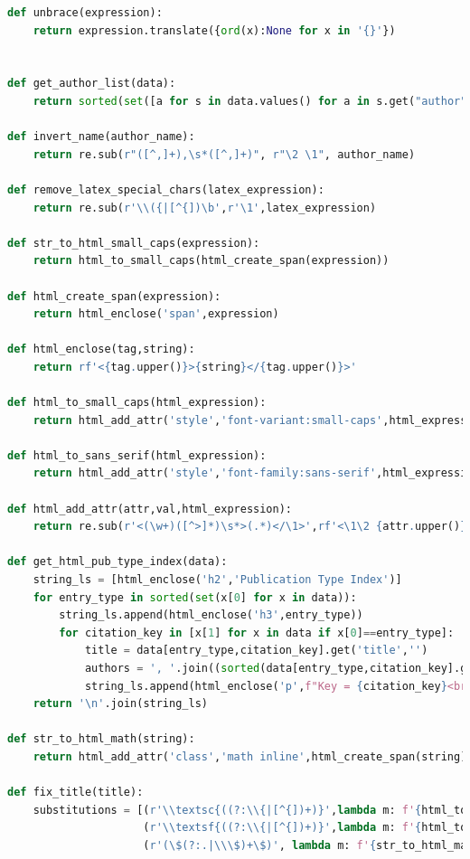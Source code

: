 \documentclass[11pt,a4paper]{report}
\begin{document}
\begin{appendices}
\begin{lstlisting}[language=python]
def unbrace(expression):
    return expression.translate({ord(x):None for x in '{}'})


def get_author_list(data):
    return sorted(set([a for s in data.values() for a in s.get("author", [])]))

def invert_name(author_name):
    return re.sub(r"([^,]+),\s*([^,]+)", r"\2 \1", author_name)

def remove_latex_special_chars(latex_expression):
    return re.sub(r'\\({|[^{])\b',r'\1',latex_expression)

def str_to_html_small_caps(expression):
    return html_to_small_caps(html_create_span(expression))

def html_create_span(expression):
    return html_enclose('span',expression)

def html_enclose(tag,string):
    return rf'<{tag.upper()}>{string}</{tag.upper()}>'

def html_to_small_caps(html_expression):
    return html_add_attr('style','font-variant:small-caps',html_expression)

def html_to_sans_serif(html_expression):
    return html_add_attr('style','font-family:sans-serif',html_expression)

def html_add_attr(attr,val,html_expression):
    return re.sub(r'<(\w+)([^>]*)\s*>(.*)</\1>',rf'<\1\2 {attr.upper()}="{val}">\3</\1>',html_expression)

def get_html_pub_type_index(data):
    string_ls = [html_enclose('h2','Publication Type Index')]
    for entry_type in sorted(set(x[0] for x in data)):
        string_ls.append(html_enclose('h3',entry_type))
        for citation_key in [x[1] for x in data if x[0]==entry_type]:
            title = data[entry_type,citation_key].get('title','')
            authors = ', '.join((sorted(data[entry_type,citation_key].get('author',''))))
            string_ls.append(html_enclose('p',f"Key = {citation_key}<br>Title = {fix_title(title)}<br>Autores = {authors}"))
    return '\n'.join(string_ls)

def str_to_html_math(string):
    return html_add_attr('class','math inline',html_create_span(string))

def fix_title(title):
    substitutions = [(r'\\textsc{((?:\\{|[^{])+)}',lambda m: f'{html_to_small_caps(html_create_span(m.group(1)))}'),
                     (r'\\textsf{((?:\\{|[^{])+)}',lambda m: f'{html_to_sans_serif(html_create_span(m.group(1)))}'),
                     (r'(\$(?:.|\\\$)+\$)', lambda m: f'{str_to_html_math(m.group(1))}')]



\end{lstlisting}
\end{appendices}
\end{document}

